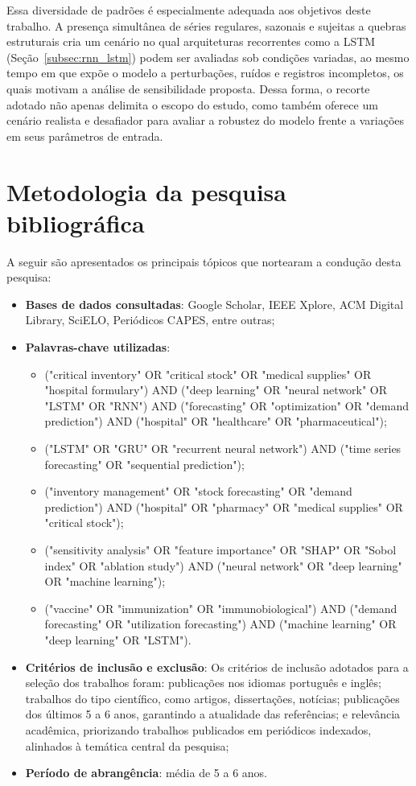 \documentclass[
    12pt,                %
    openright,           %
    oneside,             %
    a4paper,             %
    english,             %
    brazil               %
]{abntex2}
\begin{document}
Essa diversidade de padrões é especialmente adequada aos objetivos deste trabalho. A presença simultânea de séries regulares, sazonais e sujeitas a quebras estruturais cria um cenário no qual arquiteturas recorrentes como a LSTM (Seção~\ref{subsec:rnn_lstm}) podem ser avaliadas sob condições variadas, ao mesmo tempo em que expõe o modelo a perturbações, ruídos e registros incompletos, os quais motivam a análise de sensibilidade proposta. Dessa forma, o recorte adotado não apenas delimita o escopo do estudo, como também oferece um cenário realista e desafiador para avaliar a robustez do modelo frente a variações em seus parâmetros de entrada.

\section{Metodologia da pesquisa bibliográfica}
\label{sec:metodologia_pesquisa}

A seguir são apresentados os principais tópicos que nortearam a condução desta pesquisa:

\begin{itemize}
    \item \textbf{Bases de dados consultadas}: Google Scholar, IEEE Xplore, ACM Digital Library, SciELO, Periódicos CAPES, entre outras;
    \item \textbf{Palavras-chave utilizadas}:
    \begin{itemize}
        \item ("critical inventory" OR "critical stock" OR "medical supplies" OR "hospital formulary") AND ("deep learning" OR "neural network" OR "LSTM" OR "RNN") AND ("forecasting" OR "optimization" OR "demand prediction") AND ("hospital" OR "healthcare" OR "pharmaceutical");
        \item ("LSTM" OR "GRU" OR "recurrent neural network") AND ("time series forecasting" OR "sequential prediction");
        \item ("inventory management" OR "stock forecasting" OR "demand prediction") AND ("hospital" OR "pharmacy" OR "medical supplies" OR "critical stock");
        \item ("sensitivity analysis" OR "feature importance" OR "SHAP" OR "Sobol index" OR "ablation study") AND ("neural network" OR "deep learning" OR "machine learning");
        \item ("vaccine" OR "immunization" OR "immunobiological") AND ("demand forecasting" OR "utilization forecasting") AND ("machine learning" OR "deep learning" OR "LSTM").
    \end{itemize}
    \item \textbf{Critérios de inclusão e exclusão}: Os critérios de inclusão adotados para a seleção dos trabalhos foram: publicações nos idiomas português e inglês; trabalhos do tipo científico, como artigos, dissertações, notícias; publicações dos últimos 5 a 6 anos, garantindo a atualidade das referências; e relevância acadêmica, priorizando trabalhos publicados em periódicos indexados, alinhados à temática central da pesquisa;
    \item \textbf{Período de abrangência}: média de 5 a 6 anos.
\end{itemize}
\end{document}
